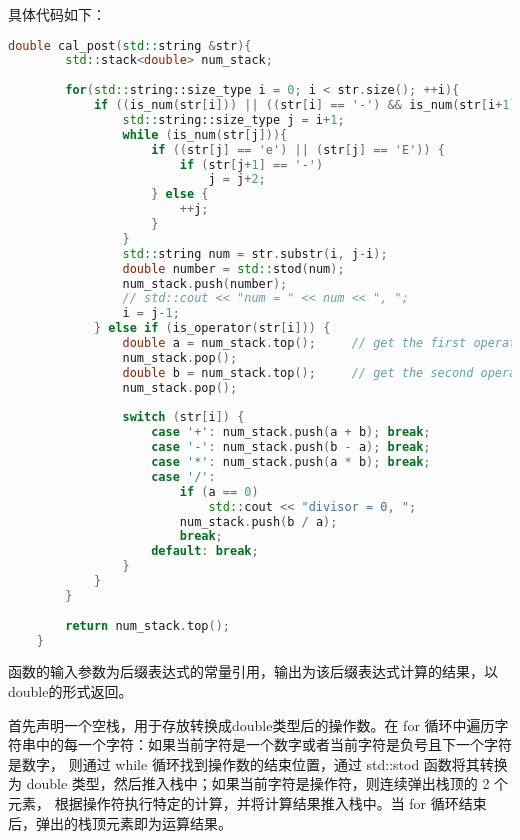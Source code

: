\documentclass[UTF8]{ctexart}
\begin{document}
具体代码如下：
\begin{lstlisting}[language=c++, breaklines=true, keywordstyle=\color{blue!70}, commentstyle=\color{red!50!green!50!blue!50}, frame=shadowbox, rulesepcolor=\color{red!20!green!20!blue!20}]
    double cal_post(std::string &str){
        std::stack<double> num_stack;
    
        for(std::string::size_type i = 0; i < str.size(); ++i){ 
            if ((is_num(str[i])) || ((str[i] == '-') && is_num(str[i+1]))) {
                std::string::size_type j = i+1;
                while (is_num(str[j])){
                    if ((str[j] == 'e') || (str[j] == 'E')) {
                        if (str[j+1] == '-')
                            j = j+2; 
                    } else {
                        ++j;
                    }
                }
                std::string num = str.substr(i, j-i);
                double number = std::stod(num);
                num_stack.push(number);
                // std::cout << "num = " << num << ", ";
                i = j-1; 
            } else if (is_operator(str[i])) {
                double a = num_stack.top();     // get the first operator
                num_stack.pop();
                double b = num_stack.top();     // get the second operator
                num_stack.pop();
    
                switch (str[i]) {
                    case '+': num_stack.push(a + b); break; 
                    case '-': num_stack.push(b - a); break; 
                    case '*': num_stack.push(a * b); break;
                    case '/': 
                        if (a == 0)
                            std::cout << "divisor = 0, "; 
                        num_stack.push(b / a); 
                        break;
                    default: break;
                }
            }
        } 
    
        return num_stack.top();
    }
\end{lstlisting}

函数的输入参数为后缀表达式的常量引用，输出为该后缀表达式计算的结果，以double的形式返回。

首先声明一个空栈，用于存放转换成double类型后的操作数。在 for 循环中遍历字符串中的每一个字符：如果当前字符是一个数字或者当前字符是负号且下一个字符是数字，
则通过 while 循环找到操作数的结束位置，通过 std::stod 函数将其转换为 double 类型，然后推入栈中；如果当前字符是操作符，则连续弹出栈顶的 2 个元素，
根据操作符执行特定的计算，并将计算结果推入栈中。当 for 循环结束后，弹出的栈顶元素即为运算结果。
\end{document}
